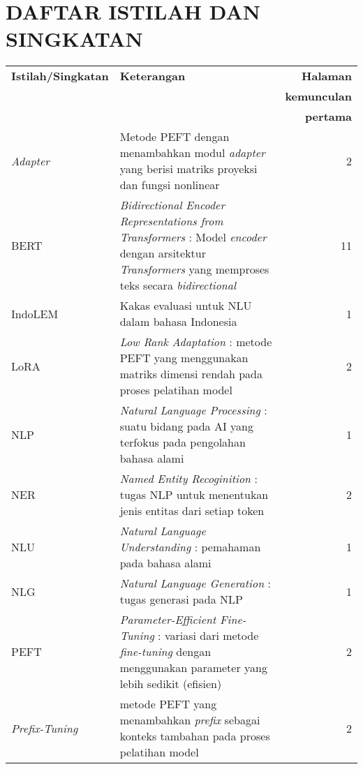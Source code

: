 \clearpage
\chapter*{DAFTAR ISTILAH DAN SINGKATAN}
\begin{center}
   \begin{table}[h]
        \renewcommand{\arraystretch}{1.5}
        \begin{tabularx}{\textwidth}{lXr}
            \textbf{Istilah/Singkatan} & \textbf{Keterangan} & \textbf{Halaman} \\
                                       & & \textbf{kemunculan} \\
                                       & & \textbf{pertama} \\
            \textit{Adapter} & Metode PEFT dengan menambahkan modul \textit{adapter} yang berisi matriks proyeksi dan fungsi nonlinear & 2 \\
            BERT & \textit{Bidirectional Encoder Representations from Transformers} : Model \textit{encoder} dengan arsitektur \textit{Transformers} yang memproses teks secara \textit{bidirectional} & 11 \\
            IndoLEM & Kakas evaluasi untuk NLU dalam bahasa Indonesia & 1 \\
            LoRA & \textit{Low Rank Adaptation} : metode PEFT yang menggunakan matriks dimensi rendah pada proses pelatihan model & 2 \\
            NLP & \textit{Natural Language Processing} : suatu bidang pada AI yang terfokus pada pengolahan bahasa alami & 1 \\
            NER & \textit{Named Entity Recoginition} : tugas NLP untuk menentukan jenis entitas dari setiap token & 2 \\
            NLU & \textit{Natural Language Understanding} : pemahaman pada bahasa alami & 1 \\
            NLG & \textit{Natural Language Generation} : tugas generasi pada NLP & 1 \\
            PEFT & \textit{Parameter-Efficient Fine-Tuning} : variasi dari metode \textit{fine-tuning} dengan menggunakan parameter yang lebih sedikit (efisien) & 2 \\
            \textit{Prefix-Tuning} & metode PEFT yang menambahkan \textit{prefix} sebagai konteks tambahan pada proses pelatihan model & 2 \\
        \end{tabularx}
    \end{table}
\end{center}
